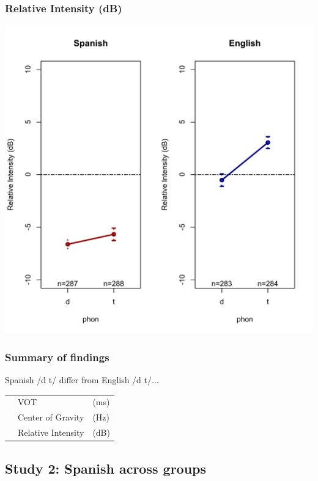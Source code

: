 \documentclass{beamer}
\newcommand{\cmark}{\ding{51}}%
\begin{document}
\begin{frame}
\frametitle{Relative Intensity (dB)}
\begin{center}
\includegraphics[scale=.375]{simplified/fig03_rimonolinguals.pdf}
\end{center}
\end{frame}

\begin{frame}
\frametitle{Summary of findings}
Spanish /d t/ differ from English /d t/...
\begin{center}
\begin{tabular}{l l l}
\cmark & VOT & (ms) \\
\cmark & Center of Gravity & (Hz) \\
\cmark & Relative Intensity & (dB) \\
\end{tabular}
\end{center}
\end{frame}

\subsection{Study 2: Spanish  across groups}

\end{document}
